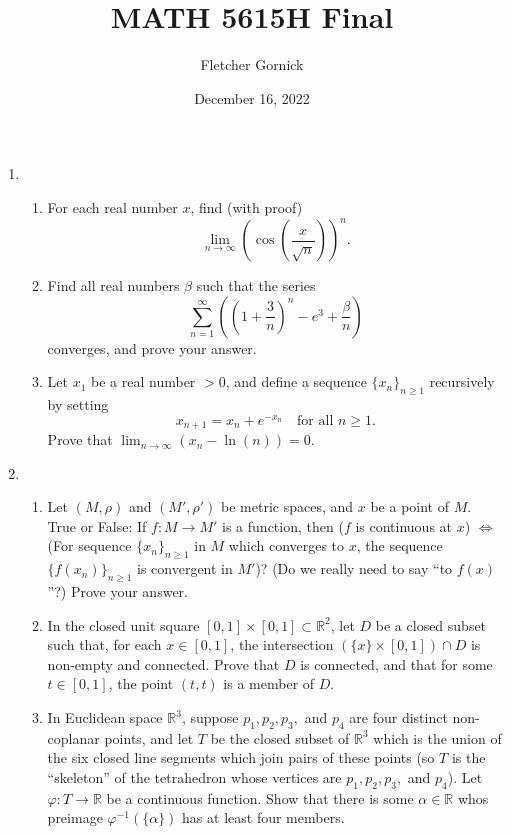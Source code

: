 \documentclass[11pt]{article}
\title{\vspace{-1.0cm}MATH 5615H Final}
\author{Fletcher Gornick}
\date{December 16, 2022}
\newcommand{\R}{\mathbb{R}}
\begin{document}
\maketitle
\newpage
\begin{enumerate}
    \item \begin{enumerate}
        \item For each real number \(x\), find (with proof)
          \[\lim_{n \to \infty} \left(\cos \left(\frac{x}{\sqrt{n}}\right)\right)^n.\]

        \item Find all real numbers \(\beta\) such that the series 
          \[\sum_{n=1}^{\infty}\left( \left(1 + \frac{3}{n}\right)^n - e^3 + \frac{\beta}{n} \right)\]
          converges, and prove your answer.

        \item Let \(x_1\) be a real number \(>0\), and define a sequence \(\{x_n\}_{n \geq 1}\) recursively by setting
          \[x_{n+1} = x_n + e^{-x_n} \quad \text{for all } n \geq 1.\]
          Prove that \(\displaystyle\lim_{n \to \infty}\left(x_n - \ln(n)\right) = 0.\)
    \end{enumerate}
    \newpage

    \item \begin{enumerate}
        \item Let \((M, \rho)\) and \((M', \rho')\) be metric spaces, and \(x\) be a point of \(M\).  True or False: If 
          \(f \colon M \to M'\) is a function, then (\(f\) is continuous at \(x\)) \(\iff\) (For \underline{} 
          sequence \(\{x_n\}_{n \geq 1}\) in \(M\) which converges to \(x\), the sequence \(\{f(x_n)\}_{n \geq 1}\) is 
          convergent in \(M'\))? (Do we really need to say ``to \(f(x)\)''?) Prove your answer.

        \item In the closed unit square \([0,1] \times [0,1] \subset \R^2\), let \(D\) be a closed subset such that, for 
          each \(x \in [0,1]\), the intersection \(\left(\{x\} \times [0,1]\right) \cap D\) is non-empty and connected.  Prove 
          that \(D\) is connected, and that for some \(t \in [0,1]\), the point \((t,t)\) is a member of \(D\).

        \item In Euclidean space \(\R^3\), suppose \(p_1, p_2, p_3,\) and \(p_4\) are four distinct non-coplanar points, and let 
          \(T\) be the closed subset of \(\R^3\) which is the union of the six closed line segments which join pairs of these 
          points (so \(T\) is the ``skeleton'' of the tetrahedron whose vertices are \(p_1, p_2, p_3,\) and \(p_4\)). Let 
          \(\varphi \colon T \to \R\) be a continuous function.  Show that there is some \(\alpha \in \R\) whos preimage 
          \(\varphi^{-1}\left(\{\alpha\}\right)\) has at least four members.
    \end{enumerate}
    \newpage


\end{enumerate}
\end{document}
